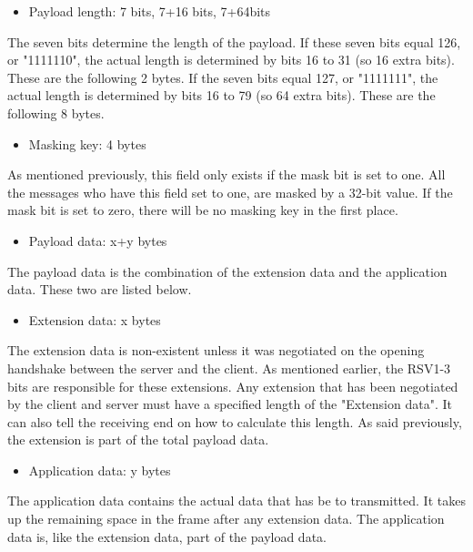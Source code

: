 \documentclass[a4paper, 11pt]{report}
\begin{document}
	\begin{itemize}
		\item {Payload length: 7 bits, 7+16 bits, 7+64bits}
	\end{itemize}
The seven bits determine the length of the payload. If these seven bits equal 126, or "1111110", the actual length is determined by bits 16 to 31 (so 16 extra bits). These are the following 2 bytes. If the seven bits equal 127, or "1111111", the actual length is determined by bits 16 to 79 (so 64 extra bits). These are the following 8 bytes.

	\begin{itemize}
		\item {Masking key: 4 bytes}
	\end{itemize}
As mentioned previously, this field only exists if the mask bit is set to one. All the messages who have this field set to one, are masked by a 32-bit value. If the mask bit is set to zero, there will be no masking key in the first place.

	\begin{itemize}
		\item{Payload data: x+y bytes}
	\end{itemize}
The payload data is the combination of the extension data and the application data. These two are listed below.

	\begin{itemize}
		\item{Extension data: x bytes}
	\end{itemize}
The extension data is non-existent unless it was negotiated on the opening handshake between the server and the client. As mentioned earlier, the RSV1-3 bits are responsible for these extensions. Any extension that has been negotiated by the client and server must have a specified length of the "Extension data". It can also tell the receiving end on how to calculate this length. As said previously, the extension is part of the total payload data.
	
	\begin{itemize}
		\item{Application data: y bytes}
	\end{itemize}
The application data contains the actual data that has be to transmitted. It takes up the remaining space in the frame after any extension data. The application data is, like the extension data, part of the payload data.

\end{document}
